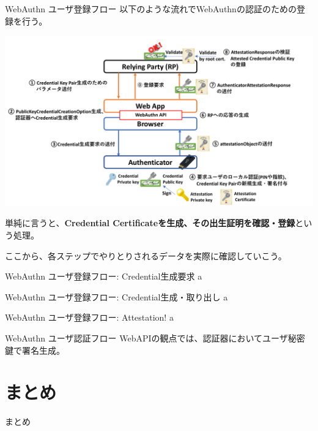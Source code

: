 \documentclass[12pt,dvipdfmx,uplatex]{beamer}
\begin{document}
\begin{frame}{WebAuthn ユーザ登録フロー}
以下のような流れでWebAuthnの認証のための登録を行う。
\begin{center}
\includegraphics[width=0.8\linewidth]{Figs/webauthn-registration0.pdf}
\end{center}
単純に言うと、\textbf{Credential Certificateを生成、その出生証明を確認・登録}という処理。

\end{frame}

\begin{frame}
ここから、各ステップでやりとりされるデータを実際に確認していこう。
\end{frame}

\begin{frame}{WebAuthn ユーザ登録フロー: Credential生成要求}
a
\end{frame}

\begin{frame}{WebAuthn ユーザ登録フロー: Credential生成・取り出し}
a
\end{frame}

\begin{frame}{WebAuthn ユーザ登録フロー: Attestation!}
a
\end{frame}

\begin{frame}{WebAuthn ユーザ認証フロー}
WebAPIの観点では、認証器においてユーザ秘密鍵で署名生成。
\end{frame}

\section{まとめ}
\begin{frame}
\centering
{\huge まとめ}
\end{frame}

\begin{frame}
 
\end{frame}





 

\end{document}
